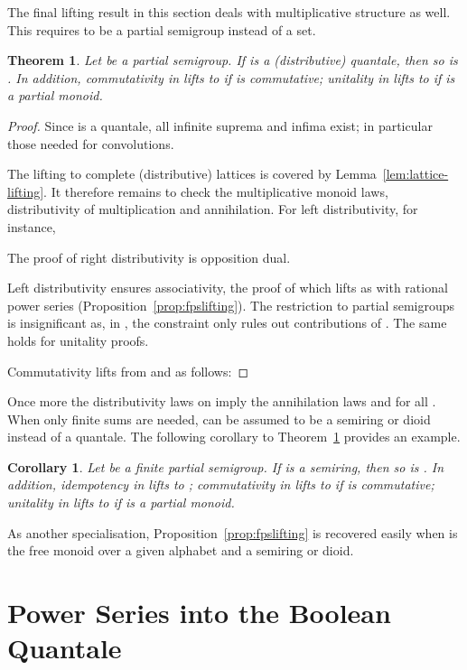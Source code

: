 \documentclass[12pt]{article}
\newtheorem{theorem}{Theorem}
\newtheorem{corollary}{Corollary}
\theoremstyle{definition}
\newcommand{\refprop}[1]{Proposition~\ref{#1}}
\newcommand{\refthm}[1]{Theorem~\ref{#1}}
\begin{document}
The final lifting result in this section deals with multiplicative
structure as well. This requires  to be a partial semigroup instead
of a set.
\begin{theorem}\label{thm:quantale-lifting} Let  be a 
  partial semigroup. If  is a (distributive) quantale,
  then so is . In addition, commutativity in 
  lifts to  if  is commutative; unitality in  lifts to 
   if  is a partial monoid. 
\end{theorem}
\begin{proof}
  Since  is a quantale, all infinite suprema and infima exist; in
  particular those needed for convolutions.

  The lifting to complete (distributive) lattices is covered by
  Lemma~\ref{lem:lattice-lifting}.  It therefore remains to check the
  multiplicative monoid laws, distributivity of multiplication and
  annihilation. For left distributivity, for instance,
    
    The proof of right distributivity is opposition dual. 

    Left distributivity ensures associativity, the proof of which
    lifts as with rational power series
    (Proposition~\ref{prop:fpslifting}).  The restriction to partial
    semigroups is insignificant as, in , the constraint
     only rules out contributions of . The same
    holds for unitality proofs.

    Commutativity lifts from  and  as follows:

\end{proof}

Once more the distributivity laws on  imply the annihilation laws
 and  for all . When only finite
sums are needed,  can be assumed to be a semiring or dioid instead
of a quantale.  The following corollary to
\refthm{thm:quantale-lifting} provides an example.
\begin{corollary}\label{cor:quantale-lifting-finite} Let  be a finite
  partial semigroup. If  is a semiring, then so is
  . In addition, idempotency in  lifts to ;
  commutativity in  lifts to  if  is commutative; unitality
  in  lifts to  if  is a partial monoid.
\end{corollary}
As another specialisation, \refprop{prop:fpslifting} is recovered
easily when  is the free monoid over a given alphabet and  a
semiring or dioid.


\section{Power Series into the  Boolean Quantale}\label{sec:booleancase}
\end{document}

